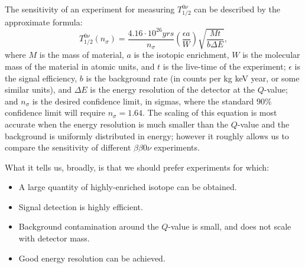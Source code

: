 The sensitivity of an experiment for measuring $T_{1/2}^{0\nu}$ can be described by the approximate formula:~\cite{RMPbb0n}
\begin{equation}\label{eqn:ApproxHalflifeSensitivity}
T_{1/2}^{0\nu}(n_\sigma) = \frac{4.16 \cdot 10^{26} yrs}{n_\sigma} \left( \frac{\epsilon a}{W}\right) \sqrt{\frac{Mt}{b \Delta E}},
\end{equation}
where $M$ is the mass of material, $a$ is the isotopic enrichment, $W$ is the molecular mass of the material in atomic units, and $t$ is the live-time of the experiment; $\epsilon$ is the signal efficiency, $b$ is the background rate (in counts per kg keV year, or some similar units), and $\Delta E$ is the energy resolution of the detector at the $Q$-value; and $n_\sigma$ is the desired confidence limit, in sigmas, where the standard $90\%$ confidence limit will require $n_\sigma = 1.64$.  The scaling of this equation is most accurate when the energy resolution is much smaller than the $Q$-value and the background is uniformly distributed in energy; however it roughly allows us to compare the sensitivity of different $\beta\beta 0\nu$ experiments.

What it tells us, broadly, is that we should prefer experiments for which:
\begin{itemize}
\item A large quantity of highly-enriched isotope can be obtained.
\item Signal detection is highly efficient.
\item Background contamination around the $Q$-value is small, and does not scale with detector mass.
\item Good energy resolution can be achieved.
\end{itemize}

